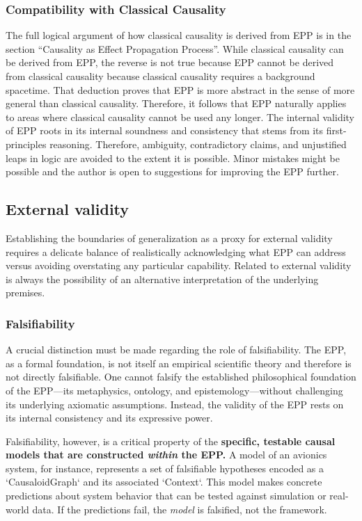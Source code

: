\subsubsection{Compatibility with Classical Causality}

The full logical argument of how classical causality is derived from EPP is in the section “Causality as Effect Propagation Process”.
While classical causality can be derived from EPP, the reverse is not true because EPP cannot be derived from classical causality because classical causality requires a background spacetime. That deduction proves that EPP is more abstract in the sense of more general than classical causality. Therefore, it follows that EPP naturally applies to areas where classical causality cannot be used any longer. The internal validity of EPP roots in its internal soundness and consistency that stems from its first-principles reasoning. Therefore, ambiguity, contradictory claims, and unjustified leaps in logic are avoided to the extent it is possible. Minor mistakes might be possible and the author is open to suggestions for improving the EPP further.

\subsection{External validity}
\label{sec:validity_external}

Establishing the boundaries of generalization as a proxy for external validity requires a delicate balance of realistically acknowledging what EPP can address versus avoiding overstating  any particular capability. Related to external validity is always the possibility of an alternative interpretation of the underlying premises.


\subsubsection{Falsifiability}

A crucial distinction must be made regarding the role of falsifiability. The EPP, as a formal foundation, is not itself an empirical scientific theory and therefore is not directly falsifiable. One cannot falsify the established philosophical foundation of the EPP—its metaphysics, ontology, and epistemology—without challenging its underlying axiomatic assumptions. Instead, the validity of the EPP rests on its internal consistency and its expressive power.

Falsifiability, however, is a critical property of the \textbf{specific, testable causal models that are constructed \textit{within} the EPP.} A model of an avionics system, for instance, represents a set of falsifiable hypotheses encoded as a `CausaloidGraph` and its associated `Context`. This model makes concrete predictions about system behavior that can be tested against simulation or real-world data. If the predictions fail, the \textit{model} is falsified, not the framework.

